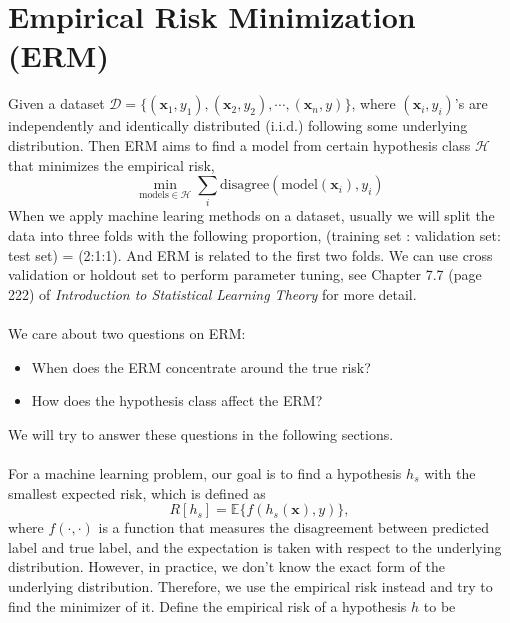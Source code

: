 \documentclass[12pt]{report}
\def\cD{\mathcal D}
\def\cH{\mathcal H}
\def\bx{\bm{x}}
\def\bbE{\mathbb E}
\begin{document}

\maketitle




\section{Empirical Risk Minimization (ERM)}
Given a dataset $\cD = \{(\bx_1, y_1), (\bx_2, y_2), \cdots, (\bx_n, y)\}$, where $(\bx_i, y_i)$'s are independently and identically distributed (i.i.d.) following some underlying distribution. Then ERM aims to find a model from certain hypothesis class $\cH$ that minimizes the empirical risk,
\[
\min_{\text{models} \in \cH} \sum_i \text{disagree} ( \text{model}(\bx_i), y_i)
\]
When we apply machine learing methods on a dataset, usually we will split the data into three folds with the following proportion, (training set : validation set: test set) = (2:1:1). And ERM is related to the first two folds. We can use cross validation or holdout set to perform parameter tuning, see Chapter 7.7 (page 222) of \textit{Introduction to Statistical Learning Theory} for more detail.
~\\~\\
We care about two questions on ERM:
\begin{itemize}
\item When does the ERM concentrate around the true risk?
\item How does the hypothesis class affect the ERM?
\end{itemize}
We will try to answer these questions in the following sections.
~\\~\\
For a machine learning problem, our goal is to find a hypothesis $h_s$ with the smallest expected risk, which is defined as 
\begin{equation}
  \label{eq:expected_risk}
  R[h_s] = \bbE \{ f(h_s(\bx), y)\},
\end{equation}
where $f(\cdot, \cdot)$ is a function that measures the disagreement between predicted label and true label, and the expectation is taken with respect to the underlying distribution. However, in practice, we don't know the exact form of the underlying distribution. Therefore, we use the empirical risk instead and try to find the minimizer of it. Define the empirical risk of a hypothesis $h$ to be
\end{document}
